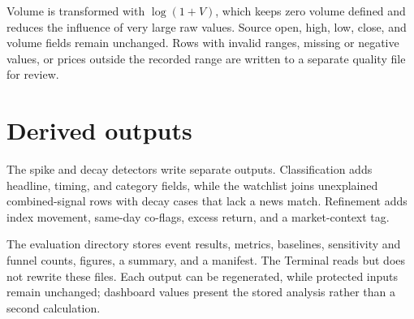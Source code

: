 Volume is transformed with $\log(1+V)$, which keeps zero volume defined and
reduces the influence of very large raw values. Source open, high, low, close,
and volume fields remain unchanged. Rows with invalid ranges, missing or
negative values, or prices outside the recorded range are written to a
separate quality file for review.

\section{Derived outputs}

The spike and decay detectors write separate outputs. Classification adds
headline, timing, and category fields, while the watchlist joins unexplained
combined-signal rows with decay cases that lack a news match. Refinement adds
index movement, same-day co-flags, excess return, and a market-context tag.

The evaluation directory stores event results, metrics, baselines, sensitivity
and funnel counts, figures, a summary, and a manifest. The Terminal reads but
does not rewrite these files. Each output can be regenerated, while protected
inputs remain unchanged; dashboard values present the stored analysis rather
than a second calculation.
